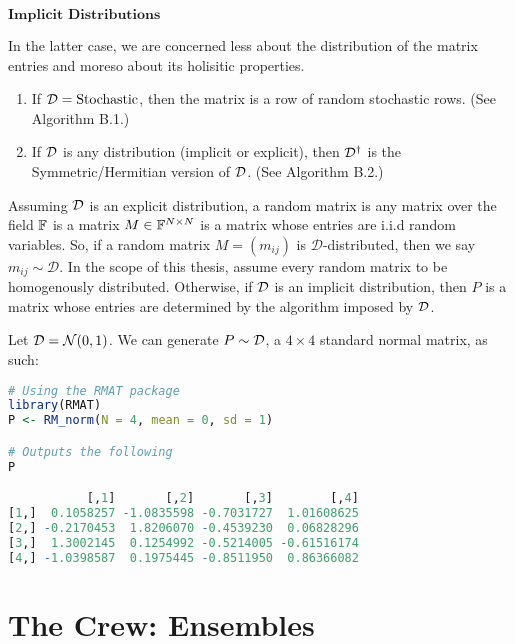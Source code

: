 \newpage

$\textbf{Implicit Distributions}$ \hfill

In the latter case, we are concerned less about the distribution of the matrix entries and moreso about its holisitic properties.

\begin{enumerate}
\item If $\mathcal{D} = \text{Stochastic}$, then the matrix is a row of random stochastic rows. (See Algorithm B.1.)
\item If $\mathcal{D}$ is any distribution (implicit or explicit), then $\mathcal{D}^{\dagger}$ is the Symmetric/Hermitian version of $\mathcal{D}$. (See Algorithm B.2.)
\end{enumerate}

\begin{definition}
Assuming $\mathcal{D}$ is an explicit distribution, a random matrix is any matrix over the field $\mathbb{F}$ is a matrix $M \in \mathbb{F}^{N \times N}$ is a matrix whose entries are i.i.d random variables. So, if a random matrix $M = (m_{ij})$ is $\mathcal{D}$-distributed, then we say $m_{ij} \sim \mathcal{D}$. In the scope of this thesis, assume every random matrix to be homogenously distributed. Otherwise, if $\mathcal{D}$ is an implicit distribution, then $P$ is a matrix whose entries are determined by the algorithm imposed by $\mathcal{D}$.
\end{definition}

\begin{code}
Let $\mathcal{D} = \mathcal{N}(0,1)$. We can generate $P \sim \mathcal{D}$, a $4 \times 4$ standard normal matrix, as such:
\end{code}

\begin{lstlisting}[language=R]
# Using the RMAT package
library(RMAT)
P <- RM_norm(N = 4, mean = 0, sd = 1)

# Outputs the following
P

           [,1]       [,2]       [,3]        [,4]
[1,]  0.1058257 -1.0835598 -0.7031727  1.01608625
[2,] -0.2170453  1.8206070 -0.4539230  0.06828296
[3,]  1.3002145  0.1254992 -0.5214005 -0.61516174
[4,] -1.0398587  0.1975445 -0.8511950  0.86366082
\end{lstlisting}

\newpage

\section{The Crew: Ensembles}

